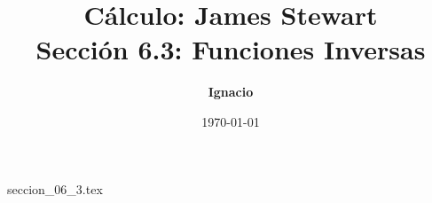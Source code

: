 \documentclass[11pt,spanish,oneside]{report}
\title{\textbf{Cálculo: James Stewart} \\ \Large Sección 6.3: Funciones Inversas}
\author{\textbf{Ignacio}}
\date{\today}
\begin{document}
\maketitle

{seccion_06_3.tex}
\end{document}
